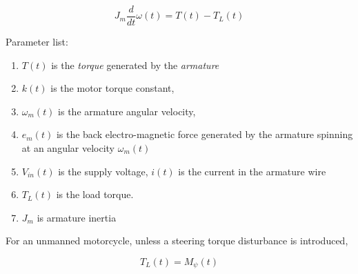 \documentclass[11pt]{article}
\begin{document}
\begin{equation}
    J_{m}\frac{d}{dt}\omega(t) = T(t) - T_{L}(t)
\end{equation}

Parameter list:
\begin{enumerate}
\item  $T(t)$ is the {\em torque} generated by the {\em armature}

\item $k(t)$ is the motor torque constant,
\item $\omega_{m}(t)$ is the armature angular velocity,
\item $e_{m}(t)$ is the back electro-magnetic force
generated by the armature spinning at an angular velocity $\omega_{m}(t)$
\item $V_{in}(t)$ is the supply voltage, $i(t)$ is the current in the armature wire
\item $T_{L}(t)$ is the load torque.
\item $J_{m}$ is armature inertia
\end{enumerate}


For an unmanned motorcycle, unless a steering torque disturbance is introduced,

\begin{equation}
    T_{L}(t) = M_{\psi}(t)
\end{equation}



\end{document}
